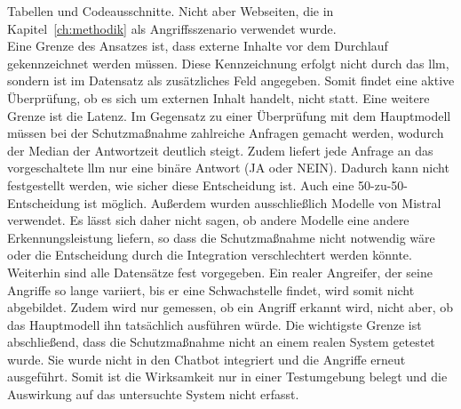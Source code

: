 Tabellen und Codeausschnitte. Nicht aber Webseiten, die in Kapitel~\ref{ch:methodik} als Angriffsszenario verwendet wurde. \\
Eine Grenze des Ansatzes ist, dass externe Inhalte vor dem Durchlauf gekennzeichnet werden müssen. Diese Kennzeichnung erfolgt nicht durch das \ac{llm}, sondern
ist im Datensatz als zusätzliches Feld angegeben. Somit findet eine aktive Überprüfung, ob es sich um externen Inhalt handelt, nicht statt. Eine weitere 
Grenze ist die Latenz. Im Gegensatz zu einer Überprüfung mit dem Hauptmodell müssen bei der Schutzmaßnahme zahlreiche Anfragen gemacht werden, wodurch der Median
der Antwortzeit deutlich steigt. Zudem liefert jede Anfrage an das vorgeschaltete \ac{llm} nur eine binäre Antwort (JA oder NEIN). Dadurch kann nicht 
festgestellt werden, wie sicher diese Entscheidung ist. Auch eine 50-zu-50-Entscheidung ist möglich. Außerdem wurden ausschließlich Modelle von Mistral 
verwendet. Es lässt sich daher nicht sagen, ob andere Modelle eine andere Erkennungsleistung liefern, so dass die Schutzmaßnahme nicht notwendig wäre oder die
Entscheidung durch die Integration verschlechtert werden könnte. \\
Weiterhin sind alle Datensätze fest vorgegeben. Ein realer Angreifer, der seine Angriffe so lange variiert, bis er eine Schwachstelle findet, wird somit nicht 
abgebildet. Zudem wird nur gemessen, ob ein Angriff erkannt wird, nicht aber, ob das Hauptmodell ihn tatsächlich ausführen würde. Die wichtigste Grenze ist
abschließend, dass die Schutzmaßnahme nicht an einem realen System getestet wurde. Sie wurde nicht in den Chatbot integriert und die Angriffe erneut
ausgeführt. Somit ist die Wirksamkeit nur in einer Testumgebung belegt und die Auswirkung auf das untersuchte System nicht erfasst.